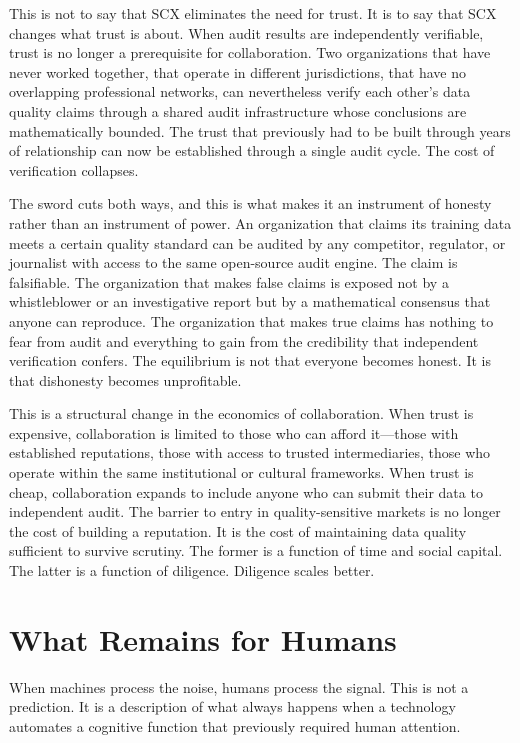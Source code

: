 \documentclass[12pt,a4paper]{article}
\begin{document}
This is not to say that SCX eliminates the need for trust. It is to say that SCX changes what trust is about. When audit results are independently verifiable, trust is no longer a prerequisite for collaboration. Two organizations that have never worked together, that operate in different jurisdictions, that have no overlapping professional networks, can nevertheless verify each other's data quality claims through a shared audit infrastructure whose conclusions are mathematically bounded. The trust that previously had to be built through years of relationship can now be established through a single audit cycle. The cost of verification collapses.

The sword cuts both ways, and this is what makes it an instrument of honesty rather than an instrument of power. An organization that claims its training data meets a certain quality standard can be audited by any competitor, regulator, or journalist with access to the same open-source audit engine. The claim is falsifiable. The organization that makes false claims is exposed not by a whistleblower or an investigative report but by a mathematical consensus that anyone can reproduce. The organization that makes true claims has nothing to fear from audit and everything to gain from the credibility that independent verification confers. The equilibrium is not that everyone becomes honest. It is that dishonesty becomes unprofitable.

This is a structural change in the economics of collaboration. When trust is expensive, collaboration is limited to those who can afford it---those with established reputations, those with access to trusted intermediaries, those who operate within the same institutional or cultural frameworks. When trust is cheap, collaboration expands to include anyone who can submit their data to independent audit. The barrier to entry in quality-sensitive markets is no longer the cost of building a reputation. It is the cost of maintaining data quality sufficient to survive scrutiny. The former is a function of time and social capital. The latter is a function of diligence. Diligence scales better.

\section{What Remains for Humans}

When machines process the noise, humans process the signal. This is not a prediction. It is a description of what always happens when a technology automates a cognitive function that previously required human attention.
\end{document}
